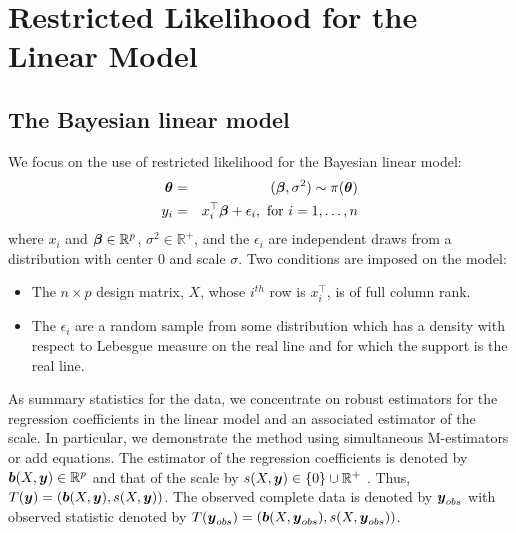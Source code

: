 \documentclass[11pt]{article}
\makeatletter
\def\bth{\mbox{\boldmath $\theta$}}
\def\bbeta{\mbox{\boldmath $\beta$}}
\newcommand{\by}{\mbox{\boldmath $y$}}
\newcommand{\bb}{\mbox{\boldmath $b$}}
\newcommand{\labitem}[2]{%
\def\@itemlabel{\textbf{#1}{.}}
\item
\def\@currentlabel{#1}\label{#2}}
\makeatother
\begin{document}
\section{Restricted Likelihood for the Linear Model}
\label{BayesLinMod}

\subsection{The Bayesian linear model}
We focus on the use of restricted likelihood for the Bayesian linear
model: 
\begin{eqnarray}
\label{LinearModel}
\bth&=&(\bbeta,\sigma^2) \sim  \pi(\bth) 
\nonumber\\
y_i  & =  & x_i^\top \bbeta + \epsilon_i , \mbox{ for } i = 1, \ldots, n 
\end{eqnarray}
where $x_i$ and $\bbeta \in \mathbb{R}^p$, $\sigma^2 \in \mathbb{R}^+$, 
and the $\epsilon_i$ are independent 
draws from a distribution with center $0$ and scale $\sigma$.
Two conditions are imposed on the model:
\begin{itemize}
\labitem{C1}{fullRank} The $n \times p$ design matrix, $X$, whose $i^{th}$ row is $x_i^\top$, 
is of full column rank.  
\labitem{C2}{supReal} The $\epsilon_i$ are a random sample from some distribution which has a density with 
respect to Lebesgue measure on the real line and for which the support is the real line.  
\end{itemize}

As summary statistics for the data, we concentrate on robust estimators for the 
regression coefficients in the linear model and an associated 
estimator of the scale. In particular, we demonstrate the method using simultaneous M-estimators \cite{} or add equations. The estimator of the regression coefficients is denoted by $\bb(X, \by)\in \mathbb R^{p}$ and that of the scale by $s(X, \by)\in \{0\} \cup {\mathbb R}^+$ . Thus, $T(\by)=(\bb(X, \by), s(X, \by))$. The observed complete data is denoted by $\by_{obs}$ with observed statistic  denoted by $T(\by_{obs})=(\bb(X, \by_{obs}), s(X, \by_{obs}))$. %
\end{document}
